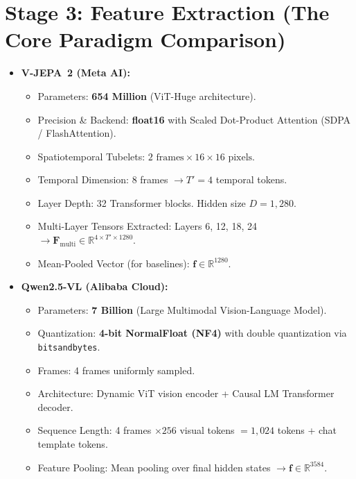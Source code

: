 \documentclass[a4paper, 11pt]{article}
\begin{document}
\section{Stage 3: Feature Extraction (The Core Paradigm Comparison)}

\begin{techbox}
\begin{itemize}
    \item \textbf{V-JEPA~2 (Meta AI):}
    \begin{itemize}
        \item Parameters: \textbf{654 Million} (ViT-Huge architecture).
        \item Precision \& Backend: \textbf{float16} with Scaled Dot-Product Attention (SDPA / FlashAttention).
        \item Spatiotemporal Tubelets: $2 \text{ frames} \times 16 \times 16 \text{ pixels}$.
        \item Temporal Dimension: 8 frames $\rightarrow T' = 4$ temporal tokens.
        \item Layer Depth: 32 Transformer blocks. Hidden size $D = 1,280$.
        \item Multi-Layer Tensors Extracted: Layers 6, 12, 18, 24 $\rightarrow \mathbf{F}_{\text{multi}} \in \mathbb{R}^{4 \times T' \times 1280}$.
        \item Mean-Pooled Vector (for baselines): $\mathbf{f} \in \mathbb{R}^{1280}$.
    \end{itemize}
    \item \textbf{Qwen2.5-VL (Alibaba Cloud):}
    \begin{itemize}
        \item Parameters: \textbf{7 Billion} (Large Multimodal Vision-Language Model).
        \item Quantization: \textbf{4-bit NormalFloat (NF4)} with double quantization via \texttt{bitsandbytes}.
        \item Frames: 4 frames uniformly sampled.
        \item Architecture: Dynamic ViT vision encoder + Causal LM Transformer decoder.
        \item Sequence Length: 4 frames $\times 256$ visual tokens $= 1,024$ tokens + chat template tokens.
        \item Feature Pooling: Mean pooling over final hidden states $\rightarrow \mathbf{f} \in \mathbb{R}^{3584}$.
    \end{itemize}
\end{itemize}
\end{techbox}
\end{document}
